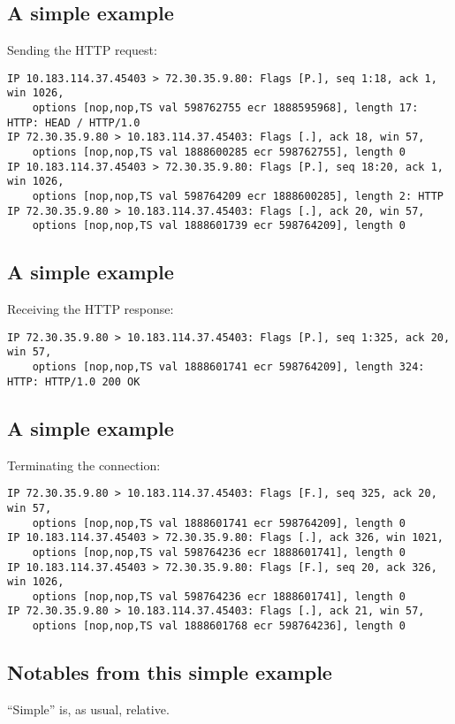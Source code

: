 \documentclass[xga]{xdvislides}
\begin{document}
\subsection{A simple example}
Sending the HTTP request:
\begin{verbatim}
IP 10.183.114.37.45403 > 72.30.35.9.80: Flags [P.], seq 1:18, ack 1, win 1026,
	options [nop,nop,TS val 598762755 ecr 1888595968], length 17: HTTP: HEAD / HTTP/1.0
IP 72.30.35.9.80 > 10.183.114.37.45403: Flags [.], ack 18, win 57,
	options [nop,nop,TS val 1888600285 ecr 598762755], length 0
IP 10.183.114.37.45403 > 72.30.35.9.80: Flags [P.], seq 18:20, ack 1, win 1026,
	options [nop,nop,TS val 598764209 ecr 1888600285], length 2: HTTP
IP 72.30.35.9.80 > 10.183.114.37.45403: Flags [.], ack 20, win 57,
	options [nop,nop,TS val 1888601739 ecr 598764209], length 0
\end{verbatim}

\subsection{A simple example}
Receiving the HTTP response:
\begin{verbatim}
IP 72.30.35.9.80 > 10.183.114.37.45403: Flags [P.], seq 1:325, ack 20, win 57,
	options [nop,nop,TS val 1888601741 ecr 598764209], length 324: HTTP: HTTP/1.0 200 OK
\end{verbatim}

\subsection{A simple example}
Terminating the connection:
\begin{verbatim}
IP 72.30.35.9.80 > 10.183.114.37.45403: Flags [F.], seq 325, ack 20, win 57,
	options [nop,nop,TS val 1888601741 ecr 598764209], length 0
IP 10.183.114.37.45403 > 72.30.35.9.80: Flags [.], ack 326, win 1021,
	options [nop,nop,TS val 598764236 ecr 1888601741], length 0
IP 10.183.114.37.45403 > 72.30.35.9.80: Flags [F.], seq 20, ack 326, win 1026,
	options [nop,nop,TS val 598764236 ecr 1888601741], length 0
IP 72.30.35.9.80 > 10.183.114.37.45403: Flags [.], ack 21, win 57,
	options [nop,nop,TS val 1888601768 ecr 598764236], length 0
\end{verbatim}

\subsection{Notables from this simple example}
``Simple'' is, as usual, relative.
\end{document}
